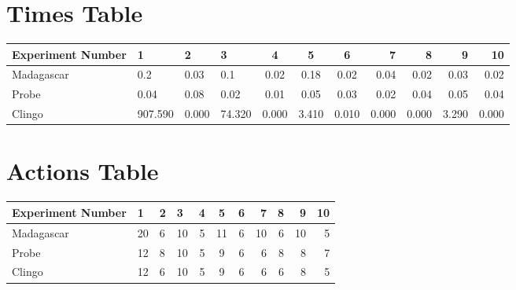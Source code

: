 \documentclass[8pt]{article}
\begin{document}
\begin{landscape}
\section{Times Table}\begin{tabular}{ | l | l | l | l | c | c | c | r | r | r | r | }\hline
Experiment Number & 1 & 2 & 3 & 4 & 5 & 6 & 7 & 8 & 9 & 10\\  \hline
Madagascar & 0.2 & 0.03 & 0.1 & 0.02 & 0.18 & 0.02 & 0.04 & 0.02 & 0.03 & 0.02\\  \hline
Probe & 0.04 & 0.08 & 0.02 & 0.01 & 0.05 & 0.03 & 0.02 & 0.04 & 0.05 & 0.04\\  \hline
Clingo & 907.590 & 0.000 & 74.320 & 0.000 & 3.410 & 0.010 & 0.000 & 0.000 & 3.290 & 0.000\\  \hline
\end{tabular}
\section{Actions Table}\begin{tabular}{ | l | l | l | l | c | c | c | r | r | r | r | }\hline
Experiment Number & 1 & 2 & 3 & 4 & 5 & 6 & 7 & 8 & 9 & 10\\ \hline
 Madagascar & 20 & 6 & 10 & 5 & 11 & 6 & 10 & 6 & 10 & 5\\ \hline
 Probe & 12 & 8 & 10 & 5 & 9 & 6 & 6 & 8 & 8 & 7\\ \hline
 Clingo & 12 & 6 & 10 & 5 & 9 & 6 & 6 & 6 & 8 & 5\\ \hline
\end{tabular}
\end{landscape}
\end{document}
